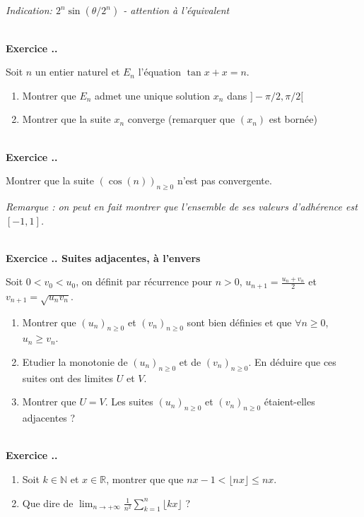 \documentclass{article}
\newcommand{\mb}[1]{\mathbb{#1}}
\newcounter{exo}
\newcommand{\exercice}[1][\null]{\textbf{\\ Exercice \thesection.\theexo. #1} \addtocounter{exo}{1}}
\begin{document}
\emph{Indication: $2^n \sin (\theta/ 2^n)$ - attention à l'équivalent}

\exercice 

Soit $n$ un entier naturel et $E_n$ l'équation
$\tan x + x = n$.

\begin{enumerate}
    \item Montrer que $E_n$ admet une unique solution $x_n$ dans 
    $]-\pi/2, \pi/2[$
    \item Montrer que la suite $x_n$ converge (remarquer que $(x_n)$ 
        est bornée)
\end{enumerate}


\exercice

Montrer que la suite $(\cos(n))_{n \ge 0}$ n'est pas convergente.

\emph{Remarque : on peut en fait montrer que l'ensemble de ses valeurs d'adhérence est $[-1,1]$.}



\exercice[Suites adjacentes, à l'envers]

Soit $0 < v_0 < u_0$, on définit par récurrence pour $n > 0$, $u_{n+1} = \frac{u_n+v_n}{2}$ et $v_{n+1} = \sqrt{u_n v_n}$.

\begin{enumerate}

\item Montrer que $(u_n)_{n \ge 0}$ et $(v_n)_{n \ge 0}$ sont bien définies et que $\forall n \ge 0$, $u_n \ge v_n$.

\item Etudier la monotonie de $(u_n)_{n \ge 0}$ et de $(v_n)_{n \ge 0}$. En déduire que ces suites ont des limites $U$ et $V$.

\item Montrer que $U =V$. Les suites $(u_n)_{n \ge 0}$ et $(v_n)_{n \ge 0}$ étaient-elles adjacentes ?


\end{enumerate}


\exercice

\begin{enumerate}

\item Soit $k \in \mb{N}$ et $x \in \mb{R}$, montrer que que $nx -1 < \lfloor nx \rfloor \le nx$.

\item Que dire de $\displaystyle \lim_{n \to + \infty} \frac{1}{n^2} \sum_{k=1}^n \lfloor kx \rfloor$ ?
\end{enumerate}
\end{document}
